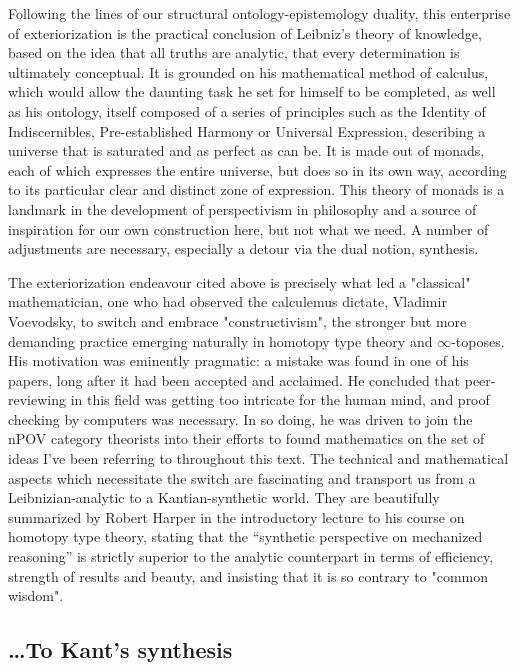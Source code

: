 \documentclass[11pt]{article}
\begin{document}
Following the lines of our structural ontology-epistemology duality, this enterprise of
exteriorization is the practical conclusion of Leibniz's theory of knowledge, based on
the idea that all truths are analytic, that every determination is ultimately
conceptual. It is grounded on his mathematical method of calculus, which would allow the
daunting task he set for himself to be completed, as well as his ontology, itself
composed of a series of principles such as the Identity of Indiscernibles,
Pre-established Harmony or Universal Expression, describing a universe that is saturated
and as perfect as can be. It is made out of monads, each of which expresses the entire
universe, but does so in its own way, according to its particular clear and distinct
zone of expression. This theory of monads is a landmark in the development of
perspectivism in philosophy and a source of inspiration for our own construction here,
but not what we need. A number of adjustments are necessary, especially a detour via the
dual notion, synthesis.

The exteriorization endeavour cited above is precisely what led a "classical"
mathematician, one who had observed the calculemus dictate, Vladimir Voevodsky, to
switch and embrace "constructivism", the stronger but more demanding practice emerging
naturally in homotopy type theory and \(\infty\)-toposes. His motivation was eminently
pragmatic: a mistake was found in one of his papers, long after it had been accepted and
acclaimed. He concluded that peer-reviewing in this field was getting too intricate for
the human mind, and proof checking by computers was necessary. In so doing, he was
driven to join the nPOV category theorists into their efforts to found mathematics on
the set of ideas I've been referring to throughout this text. The technical and
mathematical aspects which necessitate the switch are fascinating and transport us from
a Leibnizian-analytic to a Kantian-synthetic world. They are beautifully summarized by
Robert Harper in the introductory lecture to his course on homotopy type theory, stating
that the ``synthetic perspective on mechanized reasoning'' is strictly superior to the
analytic counterpart in terms of efficiency, strength of results and beauty, and
insisting that it is so contrary to "common wisdom".

\subsection*{\ldots{}To Kant's synthesis}
\end{document}
